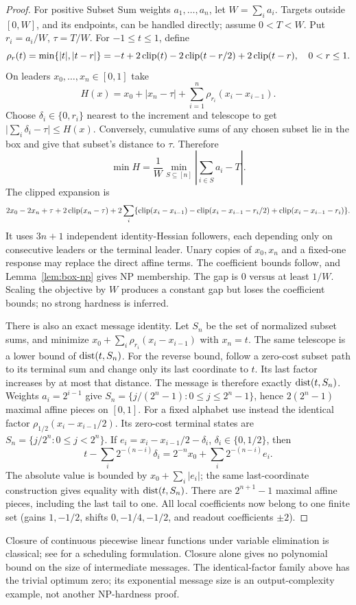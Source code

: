 \begin{proof}
For positive Subset Sum weights \(a_1,\ldots,a_n\), let \(W=\sum_i a_i\).
Targets outside \([0,W]\), and its endpoints, can be handled directly; assume
\(0<T<W\). Put \(r_i=a_i/W\), \(\tau=T/W\). For \(-1\le t\le1\), define
\[
 \rho_r(t)=\min\{|t|,|t-r|\}
 =-t+2\operatorname{clip}(t)-2\operatorname{clip}(t-r/2)+2\operatorname{clip}(t-r),\quad0<r\le1.
\]
On leaders \(x_0,\ldots,x_n\in[0,1]\) take
\[
 H(x)=x_0+|x_n-\tau|+\sum_{i=1}^n\rho_{r_i}(x_i-x_{i-1}).
\]
Choose \(\delta_i\in\{0,r_i\}\) nearest to the increment and telescope to get
\(\bigl|\sum_i\delta_i-\tau\bigr|\le H(x)\). Conversely, cumulative sums of
any chosen subset lie in the box and give that subset's distance to \(\tau\).
Therefore
\begin{equation}\label{eq:subset-path-distance}
 \min H=\frac1W\min_{S\subseteq[n]}\left|\sum_{i\in S}a_i-T\right|.
\end{equation}
The clipped expansion is
\[
 2x_0-2x_n+\tau+2\operatorname{clip}(x_n-\tau)+
 2\sum_i\{\operatorname{clip}(x_i-x_{i-1})-\operatorname{clip}(x_i-x_{i-1}-r_i/2)
                         +\operatorname{clip}(x_i-x_{i-1}-r_i)\}.
\]
It uses \(3n+1\) independent identity-Hessian followers, each depending only
on consecutive leaders or the terminal leader. Unary copies of \(x_0,x_n\)
and a fixed-one response may replace the direct affine terms. The coefficient
bounds follow, and Lemma~\ref{lem:box-np} gives NP membership. The gap is
\(0\) versus at least \(1/W\). Scaling the objective by \(W\) produces a
constant gap but loses the coefficient bounds; no strong hardness is
inferred.

There is also an exact message identity. Let \(S_n\) be the set of normalized
subset sums, and minimize \(x_0+\sum_i\rho_{r_i}(x_i-x_{i-1})\) with \(x_n=t\).
The same telescope is a lower bound of \(\operatorname{dist}(t,S_n)\). For the reverse bound,
follow a zero-cost subset path to its terminal sum and change only its last
coordinate to \(t\). Its last factor increases by at most that distance.
The message is therefore exactly \(\operatorname{dist}(t,S_n)\). Weights \(a_i=2^{i-1}\)
give \(S_n=\{j/(2^n-1):0\le j\le2^n-1\}\), hence \(2(2^n-1)\) maximal
affine pieces on \([0,1]\).
For a fixed alphabet use instead the identical factor
\(\rho_{1/2}(x_i-x_{i-1}/2)\). Its zero-cost terminal states are
\(S_n=\{j/2^n:0\le j<2^n\}\). If \(e_i=x_i-x_{i-1}/2-\delta_i\),
\(\delta_i\in\{0,1/2\}\), then
\[
 t-\sum_i2^{-(n-i)}\delta_i
 =2^{-n}x_0+\sum_i2^{-(n-i)}e_i.
\]
The absolute value is bounded by \(x_0+\sum_i|e_i|\); the same last-coordinate
construction gives equality with \(\operatorname{dist}(t,S_n)\). There are
\(2^{n+1}-1\) maximal affine pieces, including the last tail to one.
All local coefficients now belong to one finite set (gains \(1,-1/2\), shifts
\(0,-1/4,-1/2\), and readout coefficients \(\pm2\)).
\end{proof}
Closure of continuous piecewise linear functions under variable elimination
is classical; see \citet[Lemmas~1--2 and Theorem~1]{MeuleauEtAl2008} for a
scheduling formulation. Closure alone gives no polynomial bound on the size of
intermediate messages. The identical-factor family above has the trivial
optimum zero; its exponential message size is an output-complexity example,
not another NP-hardness proof.

